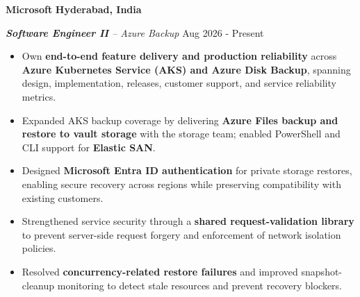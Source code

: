 


\textbf{Microsoft} \hfill {\faMapMarker} \textbf{{Hyderabad, India}}

\textit{\textbf{Software Engineer II} – Azure Backup}
\hfill {\faCalendar} Aug 2026 - Present \par
\begin{itemize}
  \item Own \textbf{end-to-end feature delivery and production reliability} across \textbf{Azure Kubernetes Service (AKS) and Azure Disk Backup}, spanning design, implementation, releases, customer support, and service reliability metrics.

  \item Expanded AKS backup coverage by delivering \textbf{Azure Files backup and restore to vault storage} with the storage team; enabled PowerShell and CLI support for \textbf{Elastic SAN}.

  \item Designed \textbf{Microsoft Entra ID authentication} for private storage restores, enabling secure recovery across regions while preserving compatibility with existing customers.

  \item Strengthened service security through a \textbf{shared request-validation library} to prevent server-side request forgery and enforcement of network isolation policies.

  \item Resolved \textbf{concurrency-related restore failures} and improved snapshot-cleanup monitoring to detect stale resources and prevent recovery blockers.
\end{itemize}

